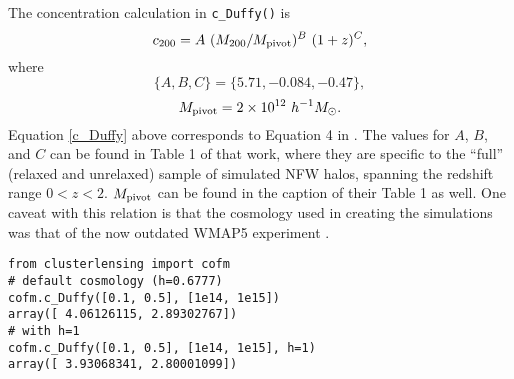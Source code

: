 \documentclass[twocolumn]{aastex6}
\newcommand{\code}{\lstinline[style=codeintext]}
\begin{document}
The concentration calculation in \code{c_Duffy()} is
\begin{equation}\label{c_Duffy}
c_{200} = A\ (M_{200} / M_{\rm pivot})^B \ (1 + z)^C,
\end{equation}
where
\begin{equation}
\{A, B, C\} = \{5.71, -0.084, -0.47\},
\end{equation}
\begin{equation}
M_{\rm pivot} = 2 \times 10^{12}\ h^{-1} M_{\odot}.
\end{equation}
Equation \ref{c_Duffy} above corresponds to Equation 4 in \citet{Duffy08}. The values for $A$, $B$, and $C$ can be found in Table 1 of that work, where they are specific to the ``full'' (relaxed and unrelaxed) sample of simulated NFW halos, spanning the redshift range $0 < z < 2$. $M_{\rm pivot}$ can be found in the caption of their Table 1 as well. One caveat with this relation is that the cosmology used in creating the \citet{Duffy08} simulations was that of the now outdated WMAP5 experiment \citep{WMAP5}.

\begin{lstlisting}
from clusterlensing import cofm
# default cosmology (h=0.6777)
cofm.c_Duffy([0.1, 0.5], [1e14, 1e15])
array([ 4.06126115, 2.89302767])
# with h=1
cofm.c_Duffy([0.1, 0.5], [1e14, 1e15], h=1)
array([ 3.93068341, 2.80001099])
\end{lstlisting}
\end{document}
